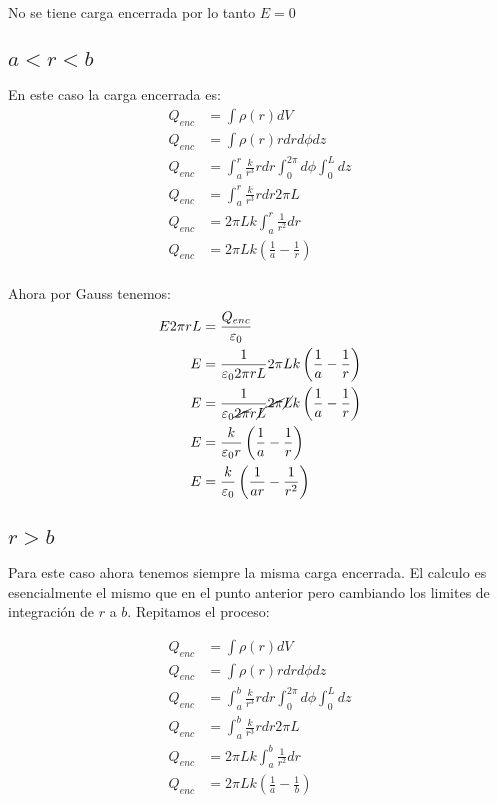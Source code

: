 \documentclass{report}
\begin{document}
No se tiene carga encerrada por lo tanto $E = 0$

\subsection{$a < r < b$}

En este caso la carga encerrada es:
\begin{align*}
	Q_{enc} &= \int \rho(r) dV\\
	Q_{enc} &= \int \rho(r) rdrd\phi dz\\
	Q_{enc} &= \int_a^r \frac{k}{r^3} rdr \int_0^{2\pi} d\phi \int_0^L dz\\
	Q_{enc} &= \int_a^r \frac{k}{r^3} rdr 2\pi L\\
	Q_{enc} &= 2\pi L k \int_a^r \frac{1}{r^2} dr\\
	Q_{enc} &= 2\pi L k \left(\frac{1}{a} - \frac{1}{r}\right)\\
\end{align*}

Ahora por Gauss tenemos:
\begin{align*}
	E 2 \pi r L &= \frac{Q_{enc}}{\varepsilon_0}\\
	E &= \frac{1}{\varepsilon_0 2\pi r L}2\pi L k \left(\frac{1}{a} - \frac{1}{r}\right)\\
	E &= \frac{1}{\varepsilon_0 \cancel{2\pi} r \cancel{L}}\cancel{2\pi} \cancel{L} k \left(\frac{1}{a} - \frac{1}{r}\right)\\
	E &= \frac{k}{\varepsilon_0 r} \left(\frac{1}{a} - \frac{1}{r}\right)\\
	E &= \frac{k}{\varepsilon_0} \left(\frac{1}{ar} - \frac{1}{r^2}\right)
\end{align*}

\subsection{$r > b$}

Para este caso ahora tenemos siempre la misma carga encerrada. El calculo es esencialmente el mismo que en el punto anterior pero cambiando los limites de integración de $r$ a $b$. Repitamos el proceso:

\begin{align*}
	Q_{enc} &= \int \rho(r) dV\\
	Q_{enc} &= \int \rho(r) rdrd\phi dz\\
	Q_{enc} &= \int_a^b \frac{k}{r^3} rdr \int_0^{2\pi} d\phi \int_0^L dz\\
	Q_{enc} &= \int_a^b \frac{k}{r^3} rdr 2\pi L\\
	Q_{enc} &= 2\pi L k \int_a^b \frac{1}{r^2} dr\\
	Q_{enc} &= 2\pi L k \left(\frac{1}{a} - \frac{1}{b}\right)\\
\end{align*}
\end{document}
